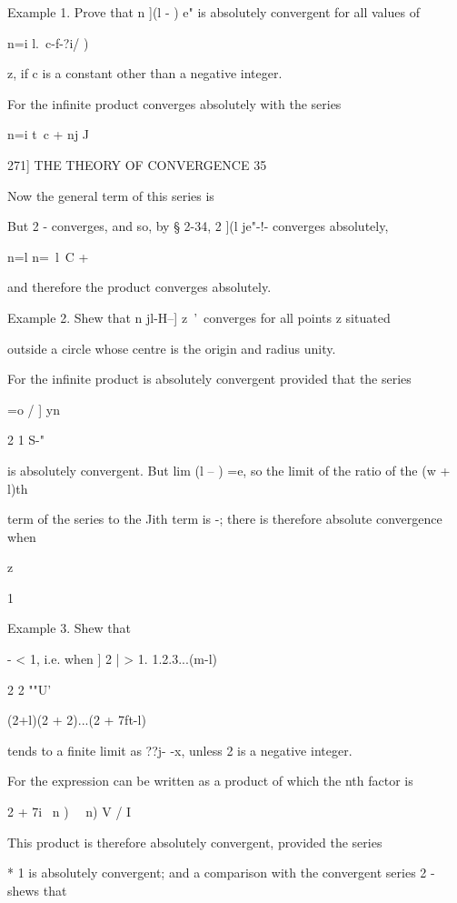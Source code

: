 Example 1. Prove that n ](l - ) e" is absolutely convergent for all
values of

n=i l.\ c-f-?i/ )

z, if c is a constant other than a negative integer.

For the infinite product converges absolutely with the series

n=i t\ c + nj J



271] THE THEORY OF CONVERGENCE 35

Now the general term of this series is

But 2 - converges, and so, by § 2-34, 2 ](l je"-!- converges
absolutely,

n=l n=\ l\ C + %

and therefore the product converges absolutely.

Example 2. Shew that n jl-H--] z~'\ converges for all points z
situated

outside a circle whose centre is the origin and radius unity.

For the infinite product is absolutely convergent provided that the
series

=o / ] yn

2 1 S-"

is absolutely convergent. But lim (l -- ) =e, so the limit of the
ratio of the (w + l)th

term of the series to the Jith term is -; there is therefore absolute
convergence when

z

1



Example 3. Shew that



- < 1, i.e. when ] 2 | > 1. 1.2.3...(m-l)



2 2 ""U'



(2+l)(2 + 2)...(2 + 7ft-l)

tends to a finite limit as ??j- -x, unless 2 is a negative integer.

For the expression can be written as a product of which the nth factor
is

2 + 7i \ n ) ~\ n) V / I

This product is therefore absolutely convergent, provided the series

* 1 is absolutely convergent; and a comparison with the convergent
series 2 - shews that

